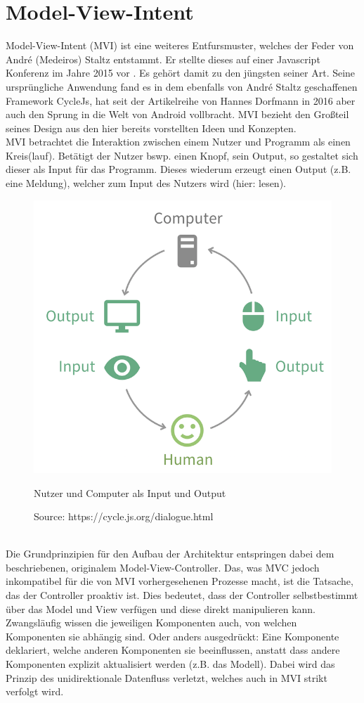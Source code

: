 \section{Model-View-Intent}
\label{sec:model-view-intent}
Model-View-Intent (MVI) ist eine weiteres Entfursmuster, welches der Feder von André (Medeiros) Staltz entstammt. Er stellte dieses auf einer Javascript Konferenz im Jahre 2015 vor
\cite{modelViewIntentIntroduction}. Es gehört damit zu den jüngsten seiner Art.
Seine ursprüngliche Anwendung fand es in dem ebenfalls von André Staltz geschaffenen Framework CycleJs, hat seit der Artikelreihe von Hannes Dorfmann in 2016
\cite{modelViewIntentOnAndroidHannesDorfmann2016}
aber auch den Sprung in die Welt von Android vollbracht. MVI bezieht den Großteil seines Design aus den hier bereits vorstellten Ideen und Konzepten.\\
MVI betrachtet die Interaktion zwischen einem Nutzer und Programm als einen Kreis(lauf). Betätigt der Nutzer bswp. einen Knopf, sein Output, so gestaltet sich dieser als Input für das Programm. Dieses wiederum erzeugt einen Output (z.B. eine Meldung), welcher zum Input des Nutzers wird (hier: lesen).
\begin{figure}[ht]
	\centering
	\includegraphics[height=0.5\textwidth]{./images/mvi-cycle}
	\caption{Nutzer und Computer als Input und Output}
	\caption*{Source: https://cycle.js.org/dialogue.html}
	\label{fig:userComputerInputOutput}
\end{figure}
\\
Die Grundprinzipien für den Aufbau der Architektur entspringen dabei dem beschriebenen, originalem Model-View-Controller. Das,
was MVC jedoch inkompatibel für die von MVI vorhergesehenen Prozesse macht, ist die Tatsache, das der Controller proaktiv ist. Dies bedeutet, dass der Controller selbstbestimmt über das Model und View verfügen und diese direkt manipulieren kann. Zwangsläufig wissen die jeweiligen Komponenten auch, von welchen Komponenten sie abhängig sind. Oder anders ausgedrückt: Eine Komponente deklariert, welche anderen Komponenten sie beeinflussen, anstatt dass andere Komponenten explizit aktualisiert werden (z.B. das Modell). Dabei wird das Prinzip des unidirektionale Datenfluss verletzt, welches auch in MVI strikt verfolgt wird. 

